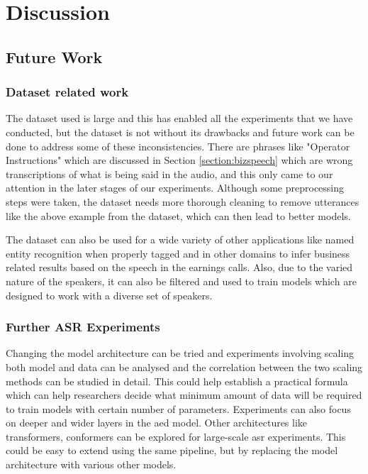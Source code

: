 \chapter{Discussion}
\label{chapter:discussion}


\section{Future Work}

\subsection{Dataset related work}
The dataset used is large and this has enabled all the experiments that we have conducted, but the dataset is not without its drawbacks and future work can be done to address some of these inconsistencies. There are phrases like "Operator Instructions" which are discussed in Section \ref{section:bizspeech} which are wrong transcriptions of what is being said in the audio, and this only came to our attention in the later stages of our experiments. Although some preprocessing steps were taken, the dataset needs more thorough cleaning to remove utterances like the above example from the dataset, which can then lead to better models.

The dataset can also be used for a wide variety of other applications like named entity recognition when properly tagged and in other domains to infer business related results based on the speech in the earnings calls. Also, due to the varied nature of the speakers, it can also be filtered and used to train models which are designed to work with a diverse set of speakers.  

\subsection{Further ASR Experiments}
Changing the model architecture can be tried and experiments involving scaling both model and data can be analysed and the correlation between the two scaling methods can be studied in detail. This could help establish a practical formula which can help researchers decide what minimum amount of data will be required to train models with certain number of parameters. Experiments can also focus on deeper and wider layers in the \acrshort{aed} model. Other architectures like transformers\cite{Vaswani2017AttentionNeed}, conformers\cite{Gulati2020Conformer:Recognition} can be explored for large-scale \acrshort{asr} experiments. This could be easy to extend using the same pipeline, but by replacing the model architecture with various other models.

